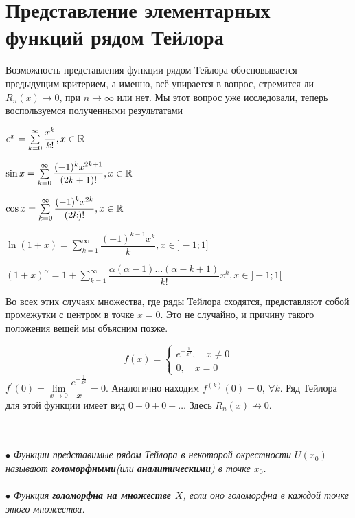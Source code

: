 	\section{Представление элементарных функций рядом Тейлора}
	Возможность представления функции рядом Тейлора обосновывается предыдущим критерием, а именно, всё упирается в вопрос, стремится ли $R_n(x)\to0$, при $n\to\infty$ или нет. Мы этот вопрос уже исследовали, теперь воспользуемся полученными результатами
	\begin{center}
		$e^x = \sum\limits_{k=0}^{\infty}\dfrac{x^k}{k!}, x\in\mathbb{R}$
	\end{center}
	\begin{center}
		$\sin x = \sum\limits_{k=0}^{\infty}\dfrac{(-1)^{k}x^{2k+1}}{(2k+1)!}, x\in\mathbb{R}$
	\end{center}
	\begin{center}
		$\cos x = \sum\limits_{k=0}^{\infty}\dfrac{(-1)^{k}x^{2k}}{(2k)!}, x\in\mathbb{R}$
	\end{center}
	\begin{center}
		$\ln(1+x) = \sum\limits_{k=1}^{\infty}\dfrac{(-1)^{k-1}x^{k}}{k}, x\in]-1;1]$
	\end{center}
	\begin{center}
		$(1+x)^{\alpha} = 1 + \sum\limits_{k=1}^{\infty}\dfrac{\alpha(\alpha-1)\ldots(\alpha-k+1)}{k!}x^{k}, x\in]-1;1[$
	\end{center}
	Во всех этих случаях множества, где ряды Тейлора сходятся, представляют собой промежутки с центром в точке $x=0$. Это не случайно, и причину такого положения вещей мы объясним позже.\\
	\begin{example}
		\[
		f(x) =
		\begin{cases}
			e^{-\frac{1}{x^2}}, \quad x \ne 0 \\
			0 , \quad x = 0
		\end{cases}
		\]
		$f^{'}(0) = \underset{x \rightarrow 0}{\lim}{\dfrac{e^{-\frac{1}{x^2}}}{x}} = 0.$ Аналогично находим $f^{(k)}(0) =0,\ \forall k$. Ряд Тейлора для этой функции имеет вид $0+0+0+ \dots$ Здесь $R_n(x) \nrightarrow 0$.
	\end{example}\\\\
	$\bullet$ \textit{Функции представимые рядом Тейлора в некоторой окрестности $U(x_0)$ называют \textbf{голоморфными}(или \textbf{аналитическими}) в точке $x_0$.}\\\\
	$\bullet$ \textit{Функция \textbf{голоморфна на множестве $X$}, если оно голоморфна в каждой точке этого множества.}
